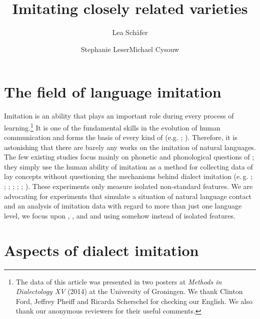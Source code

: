 \documentclass[output=paper]{LSP/langsci}
\author{Lea Schäfer\affiliation{Philipps-Universität Marburg}\and Stephanie Leser\affiliation{Philipps-Universität Marburg}\lastand Michael Cysouw\affiliation{Philipps-Universität Marburg}}
\title{Imitating closely related varieties}
\begin{document}
   

\section{The field of language imitation}\label{abstract}

Imitation is an ability that plays an important role during every process of learning.\footnote{The data of this article was presented in two posters at \textit{Methods in Dialectology XV} (2014) at the University of Groningen. We thank Clinton Ford, Jeffrey Pheiff and Ricarda Scherschel for checking our English. We also thank our anonymous reviewers for their useful comments.} It is one of the fundamental skills in the evolution of human communication and forms the basis of every kind of   (e.g. \citealt{fitch_evolution_2010,hauser_language_2002,petkov_birds_2012,uzgiris_two_1981,markham_phonetic_1997,markham_listeners_1999,meltzoff_imitation_1977,meltzoff_imitative_2002}; \citealt[123]{tomasello_shared_2007}). Therefore, it is astonishing that there are barely any  works on the imitation of natural languages. The few existing studies focus mainly on phonetic and phonological questions of ; they simply use the human ability of imitation as a method for collecting data of lay concepts without questioning the mechanisms behind dialect imitation (e.\,g. \citealt{segerup_imitation_1999}; \cite{siegel_second_2010}; \cite{adank_imitation_2010}; \cite{purschke_imitation_2010}; \cite{babel_phonetic_2009}; \cite{neuhauser_phonetische_2012}; \cite{dossey_spontaneous_2012}). These experiments only measure isolated non-standard features. We are advocating for experiments that simulate a situation of natural language contact and an analysis of imitation data with regard to more than just one language level, we focus upon , ,  and  and using somehow  instead of isolated features.
    
\section{Aspects of dialect imitation}\label{aspects}
\end{document}
